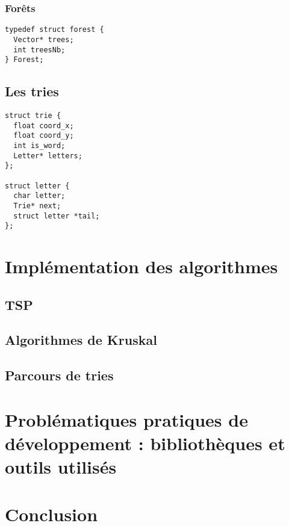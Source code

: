 \documentclass[a4paper]{article}
\begin{document}
\subsubsection{Forêts}

\begin{verbatim}
typedef struct forest {
  Vector* trees;
  int treesNb;
} Forest;
\end{verbatim}

\subsection{Les tries}

\begin{verbatim}
struct trie {
  float coord_x;
  float coord_y;
  int is_word;
  Letter* letters;
};

struct letter {
  char letter;
  Trie* next;
  struct letter *tail;
};
\end{verbatim}

\section{Implémentation des algorithmes}

\subsection{TSP}

\subsection{Algorithmes de Kruskal}

\subsection{Parcours de tries}

\section{Problématiques pratiques de développement : bibliothèques et outils utilisés}


\section*{Conclusion}
\end{document}
